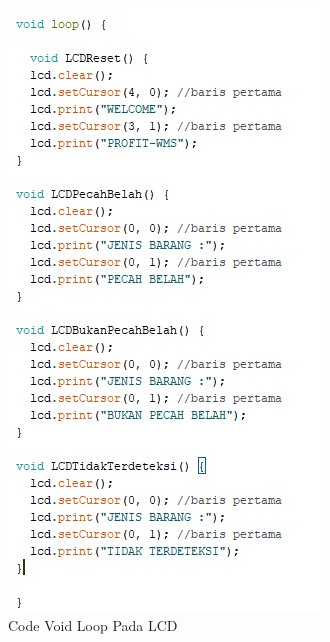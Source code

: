\begin{enumerate}
\begin{figure}[!htbp]
\centering
\includegraphics[width=.75\textwidth]{figures/CONV/vlcd.jpg}
\caption{Code Void Loop Pada LCD}\label{fig:vlcd}
\end{figure}
\end{enumerate}


